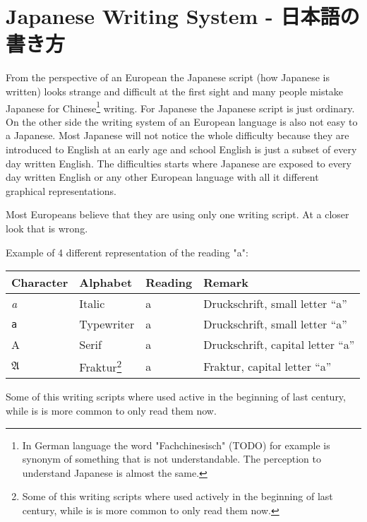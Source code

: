\chapter{Japanese Writing System - 日本語の書き方}\label{chap:JapaneseWritingSystem}

From the perspective of an European the Japanese script (how Japanese is
written) looks strange and difficult at the first sight and many people mistake
Japanese for Chinese\footnote{In German language the word "Fachchinesisch"
(TODO) for example is synonym of something that is not understandable. The
perception to understand Japanese is almost the same.} writing.  For Japanese
the Japanese script is just ordinary. On the other side the writing system of
an European language is also not easy to a Japanese. Most Japanese will not
notice the whole difficulty because they are introduced to English at an early
age and school English is just a subset of every day written English. The
difficulties starts where Japanese are exposed to every day written English or
any other European language with all it different graphical representations.

Most Europeans believe that they are using only one writing script. At a closer
look that is wrong.

\bigskip Example of 4 different representation of the reading "a":

\begin{center}
\begin{tabular}{|l|l|l|l|}
\textbf{Character}&\textbf{Alphabet}&\textbf{Reading}&\textbf{Remark}\\\hline
\textit{a}     &  Italic        & a & Druckschrift, small letter ``a'' \\ 
\texttt{a}     &  Typewriter    & a & Druckschrift, small letter ``a'' \\ 
A              &  Serif         & a & Druckschrift, capital letter ``a'' \\ 
$\mathfrak{A}$ & Fraktur\footnote{Some of this writing scripts where used actively in the beginning of last
century, while is is more common to only read them now.}& a & Fraktur, capital letter ``a''  \\ 
\end{tabular}
\end{center}

Some of this writing scripts where used active in the beginning of last
century, while is is more common to only read them now. 

